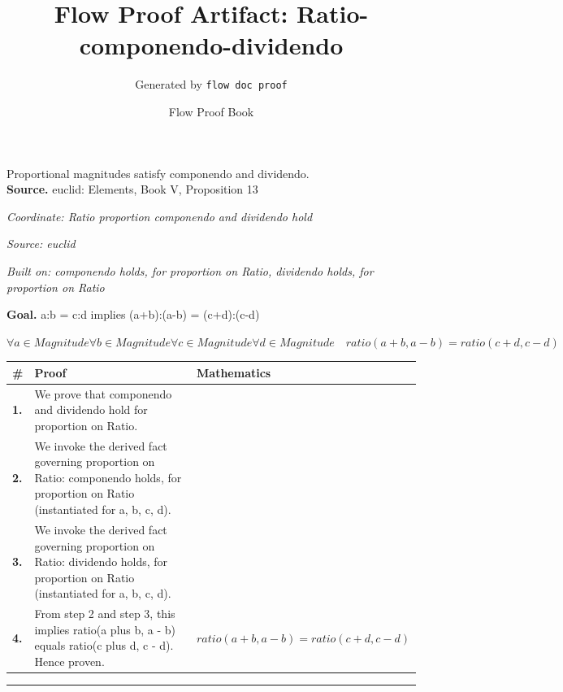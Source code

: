 \documentclass[11pt]{article}
\title{Flow Proof Artifact: Ratio-componendo-dividendo}
\author{Generated by \texttt{flow doc proof}}
\date{Flow Proof Book}
\theoremstyle{definition}
\begin{document}
\maketitle
Proportional magnitudes satisfy componendo and dividendo.\\[0.5em]
\textbf{Source.} euclid: Elements, Book V, Proposition 13\\[0.5em]
\bigskip
{}\par
\smallskip\noindent\textit{Coordinate: Ratio \cdot proportion \cdot componendo and dividendo hold}\par
\smallskip\noindent\textit{Source: euclid}\par
\smallskip\noindent\textit{Built on: componendo holds, for proportion on Ratio, dividendo holds, for proportion on Ratio}\par
\medskip
\noindent\textbf{Goal.} a:b = c:d implies (a+b):(a-b) = (c+d):(c-d)\par
\noindent$\displaystyle \forall a \in Magnitude \forall b \in Magnitude \forall c \in Magnitude \forall d \in Magnitude\quad ratio(a + b, a - b) = ratio(c + d, c - d)$\par
\medskip
\noindent
\begin{tabular}{@{} >{\raggedright\arraybackslash}p{} >{\raggedright\arraybackslash}p{} >{\raggedleft\arraybackslash}p{} @{}}
\textbf{\#} & \textbf{Proof} & \textbf{Mathematics} \\
\midrule
\textbf{1.} & We prove that componendo and dividendo hold for proportion on Ratio. & \\[0.45em]
\textbf{2.} & We invoke the derived fact governing proportion on Ratio: componendo holds, for proportion on Ratio (instantiated for a, b, c, d). & \\[0.45em]
\textbf{3.} & We invoke the derived fact governing proportion on Ratio: dividendo holds, for proportion on Ratio (instantiated for a, b, c, d). & \\[0.45em]
\textbf{4.} & From step 2 and step 3, this implies ratio(a plus b, a - b) equals ratio(c plus d, c - d). Hence proven. & $\displaystyle ratio(a + b, a - b) = ratio(c + d, c - d)$ \\[0.45em]
\bottomrule
\end{tabular}
\label{thm:Ratio-proportion-componendo_and_dividendo_hold}
\par\medskip\hrule
\end{document}
